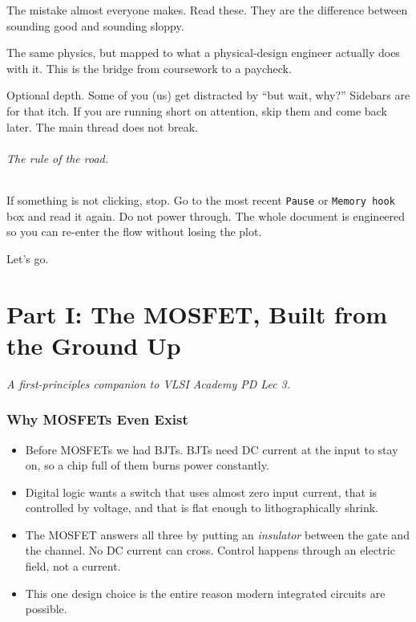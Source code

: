 \documentclass[11pt]{article}
\begin{document}
\begin{pitfall}
The mistake almost everyone makes. Read these. They are the difference between sounding good and sounding sloppy.
\end{pitfall}

\begin{pdnote}
The same physics, but mapped to what a physical-design engineer actually does with it. This is the bridge from coursework to a paycheck.
\end{pdnote}

\begin{sidebar}
Optional depth. Some of you (us) get distracted by ``but wait, why?'' Sidebars are for that itch. If you are running short on attention, skip them and come back later. The main thread does not break.
\end{sidebar}

\paragraph{The rule of the road.} If something is not clicking, stop. Go to the most recent \texttt{Pause} or \texttt{Memory hook} box and read it again. Do not power through. The whole document is engineered so you can re-enter the flow without losing the plot.

Let's go.

\tableofcontents
\newpage

\part*{Part I: The MOSFET, Built from the Ground Up}
\textit{A first-principles companion to VLSI Academy PD Lec 3.}

\section{Why MOSFETs Even Exist}

\begin{tldr}
\begin{itemize}[leftmargin=*]
\item Before MOSFETs we had BJTs. BJTs need DC current at the input to stay on, so a chip full of them burns power constantly.
\item Digital logic wants a switch that uses almost zero input current, that is controlled by voltage, and that is flat enough to lithographically shrink.
\item The MOSFET answers all three by putting an \emph{insulator} between the gate and the channel. No DC current can cross. Control happens through an electric field, not a current.
\item This one design choice is the entire reason modern integrated circuits are possible.
\end{itemize}
\end{tldr}
\end{document}
